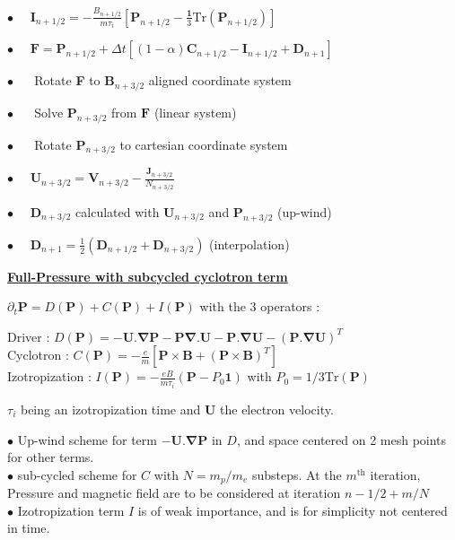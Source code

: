 \documentclass[a4paper,11pt]{letter}
\begin{document}
$\displaystyle \bullet \,\,\,\,\,\,\,\, \mathbf I_{n+1/2} = -\frac{B_{n+1/2}}{m \tau_i} \left[ \mathbf P_{n+1/2} - \frac{\mathbf 1}{3} \mathrm{Tr} (\mathbf P_{n+1/2}) \right]$

$\displaystyle \bullet \,\,\,\,\,\,\,\, \mathbf F = \mathbf P_{n+1/2} + \Delta t [(1- \alpha) \mathbf C_{n+1/2} - \mathbf I_{n+1/2} + \mathbf D_{n+1}]$

$\displaystyle \bullet \,\,\,\,\,\,\,\,$ Rotate {\bf F} to $\mathbf B_{n+3/2}$ aligned coordinate system

$\displaystyle \bullet \,\,\,\,\,\,\,\,$ Solve $\mathbf P_{n+3/2}$ from $\mathbf F$ (linear system)

$\displaystyle \bullet \,\,\,\,\,\,\,\,$ Rotate $\mathbf P_{n+3/2}$ to cartesian coordinate system

$\displaystyle \bullet \,\,\,\,\,\,\,\, \mathbf U_{n+3/2} = \mathbf V_{n+3/2} - \frac{\mathbf J_{n+3/2}}{N_{n+3/2}}$

$\displaystyle \bullet \,\,\,\,\,\,\,\, \mathbf D_{n+3/2}$ calculated with $\mathbf U_{n+3/2}$ and $\mathbf P_{n+3/2}$ (up-wind)

$\displaystyle \bullet \,\,\,\,\,\,\,\, \mathbf D_{n+1} = \frac{1}{2} ( \mathbf D_{n+1/2} + \mathbf D_{n+3/2} )$ (interpolation)

\newpage

\underline{\bf Full-Pressure with subcycled cyclotron term}

$\partial_t \mathbf P = D(\mathbf P) + C(\mathbf P) + I(\mathbf P)$ with the 3 operators :

Driver : $\displaystyle D(\mathbf P) = -\mathbf U . \boldsymbol{\nabla} \mathbf P - \mathbf P \boldsymbol{\nabla} . \mathbf U - \mathbf P . \boldsymbol{\nabla} \mathbf U - (\mathbf P . \boldsymbol{\nabla} \mathbf U)^T$ \\[0.2cm]
Cyclotron : $\displaystyle C(\mathbf P) = -\frac{e}{m} [\mathbf P \times \mathbf B + (\mathbf P \times \mathbf B)^T]$ \\[0.0cm]
Izotropization : $\displaystyle I(\mathbf P) = -\frac{e B}{m \tau_i} (\mathbf P - P_0 \mathbf 1)$ with $P_0 = 1/3 \mathrm{Tr} (\mathbf P)$

$\tau_i$ being an izotropization time and $\mathbf U$ the electron velocity.

\medskip

$\bullet$ Up-wind scheme for term $-\mathbf U . \boldsymbol{\nabla} \mathbf P$ in $D$, and space centered on 2 mesh points for other terms.\\
$\bullet$ sub-cycled scheme for $C$ with $N=m_p/m_e$ substeps. At the $m^{\mathrm{th}}$ iteration, Pressure and magnetic field are to be considered at iteration $n-1/2+m/N$\\
$\bullet$ Izotropization term $I$ is of weak importance, and is for simplicity not centered in time.
\end{document}
